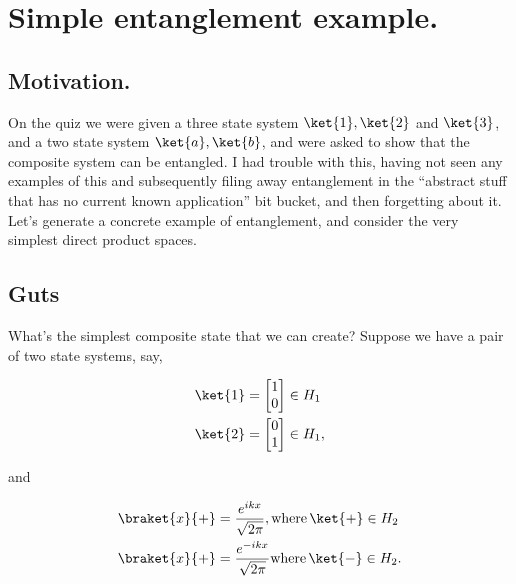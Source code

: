 
%

\chapter{Simple entanglement example.}
\label{chap:entangledSimpleExample}
{}
\date{Oct 9, 2011}

\beginArtWithToc

\section{Motivation.}

On the quiz we were given a three state system $\ket{1}, \ket{2}$ and $\ket{3}$, and a two state system $\ket{a}, \ket{b}$, and were asked to show that the composite system can be entangled.  I had trouble with this, having not seen any examples of this and subsequently filing away entanglement in the ``abstract stuff that has no current known application'' bit bucket, and then forgetting about it.  Let's generate a concrete example of entanglement, and consider the very simplest direct product spaces.

\section{Guts}

What's the simplest composite state that we can create?  Suppose we have a pair of two state systems, say,

\begin{align}\label{eqn:entangledSimpleExample:10}
\ket{1} 
&= 
\begin{bmatrix}
1 \\
0
\end{bmatrix} \in H_1 \\
\ket{2} 
&= 
\begin{bmatrix}
0 \\
1 
\end{bmatrix} \in H_1,
\end{align}

and

\begin{align}\label{eqn:entangledSimpleExample:30}
\braket{x}{+} 
&= 
\frac{e^{i k x}}{\sqrt{2\pi}},
\text{where}\, \ket{+} \in H_2 \\
\braket{x}{+} 
&= 
\frac{e^{-i k x}}{\sqrt{2\pi}}
\text{where}\, \ket{-} \in H_2.
\end{align}

